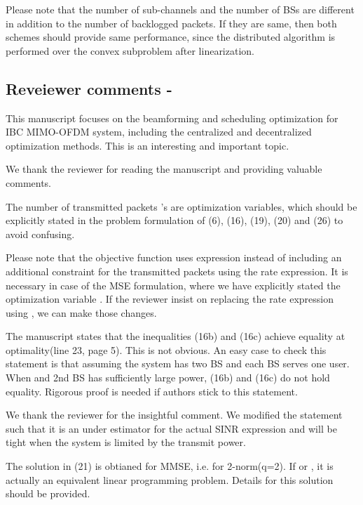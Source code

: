 \resp Please note that the number of sub-channels and the number of \acp{BS} are different in addition to the number of backlogged packets. If they are same, then both schemes should provide same performance, since the distributed algorithm is performed over the convex subproblem after linearization.

\subsection*{Reveiewer comments - }

 This manuscript focuses on the beamforming and scheduling optimization for IBC MIMO-OFDM system, including the centralized and decentralized optimization methods. This is an interesting and important topic.

\resp We thank the reviewer for reading the manuscript and providing valuable comments.

 The number of transmitted packets 's are optimization variables, which should be explicitly stated in the problem formulation of (6), (16), (19), (20) and (26) to avoid confusing.

\resp Please note that the objective function uses  expression instead of including an additional constraint for the transmitted packets using the rate expression. It is necessary in case of the MSE formulation, where we have explicitly stated the optimization variable . If the reviewer insist on replacing the rate expression using , we can make those changes.

 The manuscript states that the inequalities (16b) and (16c) achieve equality at optimality(line 23, page 5). This is not obvious. An easy case to check this statement is that assuming the system has two BS and each BS serves one user. When  and 2nd BS has sufficiently large power, (16b) and (16c) do not hold equality. Rigorous proof is needed if authors stick to this statement.

\resp We thank the reviewer for the insightful comment. We modified the statement such that it is an under estimator for the actual SINR expression and will be tight when the system is limited by the transmit power.

 The solution in (21) is obtianed for MMSE, i.e. for 2-norm(q=2). If  or , it is actually an equivalent linear programming problem. Details for this solution should be provided.

